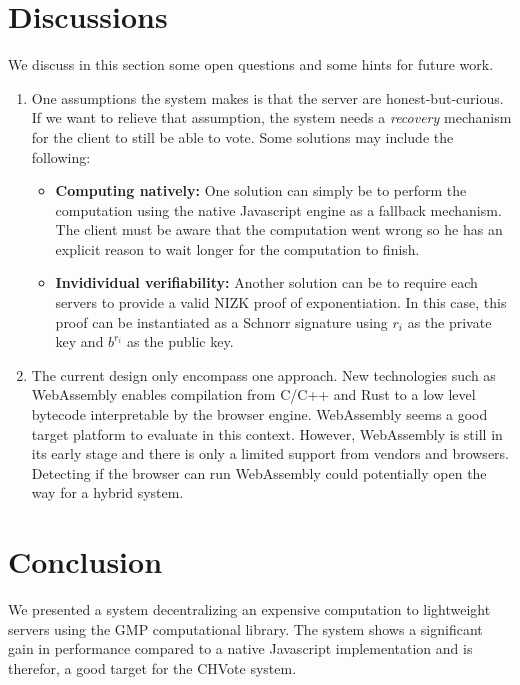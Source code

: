 \documentclass[]{article}
\begin{document}
\section{Discussions} \label{discussions}

We discuss in this section some open questions and some hints for future work. 

\begin{enumerate} 
    \item One assumptions the system makes is that the server are
        honest-but-curious. If we want to relieve that assumption, the system
        needs a \textit{recovery} mechanism for the client to still be able to
        vote.  Some solutions may include the following: 
        \begin{itemize} 
            \item \textbf{Computing natively:} One solution can simply be to
                perform the computation using the native Javascript engine as a
                fallback mechanism. The client must be aware that the
                computation went wrong so he has an explicit reason to wait
                longer for the computation to finish.  
            \item \textbf{Invidividual verifiability:} Another solution can be
                to require each servers to provide a valid NIZK proof of
                exponentiation. In this case, this proof can be instantiated as
                a Schnorr signature using $r_i$ as the private key and $b^{r_i}$
                as the public key.  
        \end{itemize} 
    \item The current design only encompass one approach. New technologies such
        as WebAssembly \cite{wasm} enables compilation from C/C++ and Rust to a
        low level bytecode interpretable by the browser engine. WebAssembly 
        seems a good target platform to evaluate in this context. However,
        WebAssembly is still in its early stage and there is only a limited
        support from vendors and browsers. Detecting if the browser can run
        WebAssembly could potentially open the way for a hybrid system.
\end{enumerate}

\section{Conclusion}

We presented a system decentralizing an expensive computation to lightweight
servers using the GMP computational library. The system shows a significant gain
in performance compared to a native Javascript implementation and is therefor,
a good target for the CHVote system.




\end{document}
